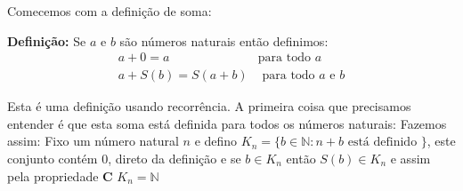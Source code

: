 \documentclass{book}
\begin{document}
Comecemos com a definição de soma: 

\textbf{Definição: } Se $a$ e $b$ são números naturais então definimos:
\begin{eqnarray}
  a + 0 = a & \text{para todo } a \\
  a + S(b) = S(a+b) & \text{ para todo } a \text{ e } b
\end{eqnarray}

Esta é uma definição usando recorrência. A primeira coisa que precisamos entender é que esta soma está definida para  todos os números naturais:
Fazemos assim:
Fixo um número natural $n$ e defino $K_n=\{b\in \mathbb{N}: n+b \text{ está definido }\}$, este conjunto contém $0$, direto da definição e se $b \in K_n$ então $S(b) \in K_n$ e assim pela propriedade \textbf{C} $K_n = \mathbb{N}$  
\end{document}

